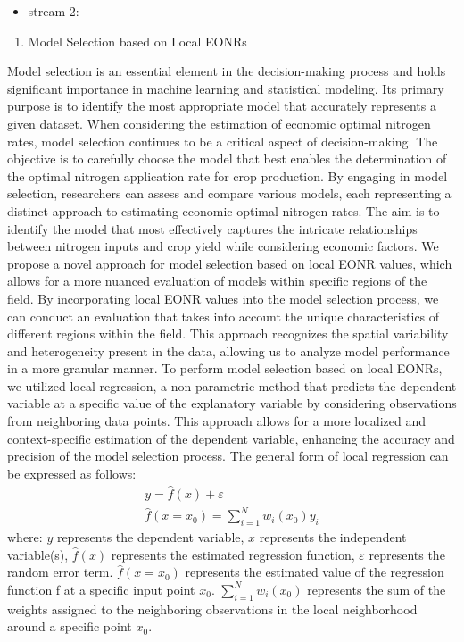 \documentclass[
  12pt,
]{article}
\providecommand{\tightlist}{%
  \setlength{\itemsep}{0pt}\setlength{\parskip}{0pt}}
\begin{document}
\begin{itemize}
\tightlist
\item
  stream 2:
\end{itemize}

\begin{enumerate}
\def\labelenumi{\arabic{enumi}.}
\setcounter{enumi}{3}
\tightlist
\item
  Model Selection based on Local EONRs
\end{enumerate}

Model selection is an essential element in the decision-making process and holds significant importance in machine learning and statistical modeling. Its primary purpose is to identify the most appropriate model that accurately represents a given dataset.
When considering the estimation of economic optimal nitrogen rates, model selection continues to be a critical aspect of decision-making. The objective is to carefully choose the model that best enables the determination of the optimal nitrogen application rate for crop production.
By engaging in model selection, researchers can assess and compare various models, each representing a distinct approach to estimating economic optimal nitrogen rates. The aim is to identify the model that most effectively captures the intricate relationships between nitrogen inputs and crop yield while considering economic factors.
We propose a novel approach for model selection based on local EONR values, which allows for a more nuanced evaluation of models within specific regions of the field. By incorporating local EONR values into the model selection process, we can conduct an evaluation that takes into account the unique characteristics of different regions within the field. This approach recognizes the spatial variability and heterogeneity present in the data, allowing us to analyze model performance in a more granular manner.
To perform model selection based on local EONRs, we utilized local regression, a non-parametric method that predicts the dependent variable at a specific value of the explanatory variable by considering observations from neighboring data points. This approach allows for a more localized and context-specific estimation of the dependent variable, enhancing the accuracy and precision of the model selection process.
The general form of local regression can be expressed as follows:
\[
\begin{gathered}
y=\hat{f}(x)+\varepsilon \\
\hat{f}\left(x=x_0\right)=\sum_{i=1}^N w_i\left(x_0\right) y_i
\end{gathered}
\]
where:
\(y\) represents the dependent variable,
\(x\) represents the independent variable(s),
\(\hat{f}(x)\) represents the estimated regression function,
\(\varepsilon\) represents the random error term.
\(\hat{f}(x=x_0)\) represents the estimated value of the regression function f at a specific input point \(x_0\).
\(\sum_{i=1}^{N}w_i(x_0)\) represents the sum of the weights assigned to the neighboring observations in the local neighborhood around a specific point \(x_0\).
\end{document}
